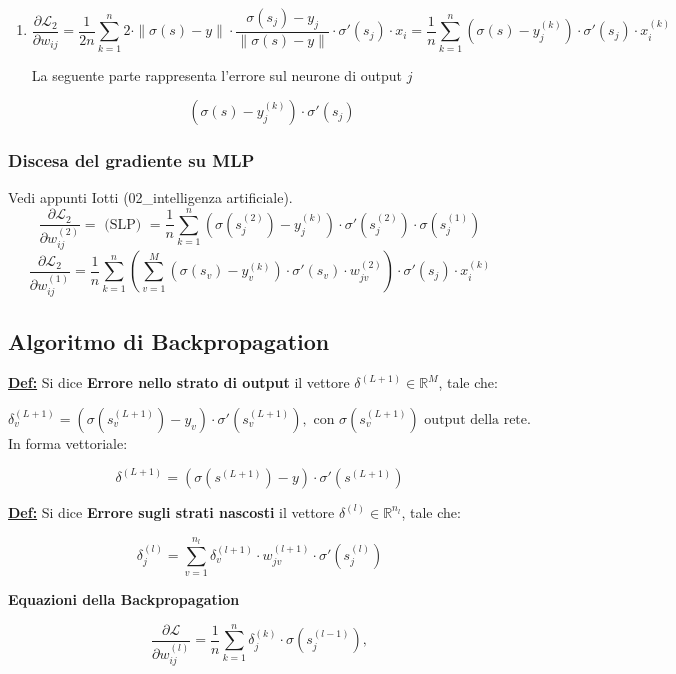 \documentclass[a4paper,12pt]{article}
\newcommand{\definizione}{\noindent\textbf{\underline{Def:}} }
\begin{document}
\begin{enumerate}
		\item

		\[
		\frac{\partial \mathcal{L}_2}{ \partial w_{ij}} = \frac{1}{2n} \sum_{k = 1}^{n} 2 \cdot \| \sigma(s) - y\| \cdot \frac{ \sigma(s_j) - y_j}{\| \sigma(s) - y \|} \cdot \sigma' (s_j) \cdot x_i = \frac{1}{n} \sum_{k = 1}^{n} (\sigma(s) - y_j^{(k)}) \cdot \sigma'(s_j) \cdot x_i^{(k)}
		\]

		La seguente parte rappresenta l'errore sul neurone di output $j$

		\[
		(\sigma(s) - y_j^{(k)}) \cdot \sigma'(s_j)
		\]
	\end{enumerate}

	\subsubsection{Discesa del gradiente su MLP}

	Vedi appunti Iotti (02\_intelligenza artificiale).
	\[
	\frac{\partial \mathcal{L}_2}{\partial w_{ij}^{(2)}} = \text{ (SLP) } = \frac{1}{n} \sum_{k=1}^{n} ( \sigma(s_j^{(2)}) - y_j^{(k)} )\cdot \sigma'(s_j^{(2)})  \cdot \sigma(s_j^{(1)})
	\]
	\[
	\frac{\partial \mathcal{L}_2}{\partial w_{ij}^{(1)}} = \frac{1}{n} \sum_{k = 1}^{n} \left( \sum_{v = 1}^{M} ( \sigma(s_v) - y_v^{(k)}) \cdot \sigma'(s_v) \cdot w_{jv}^{(2)} \right) \cdot \sigma'(s_j) \cdot x_i^{(k)}
	\]

	\subsection{Algoritmo di Backpropagation}

	\definizione Si dice \textbf{Errore nello strato di output} il vettore $\delta ^{(L + 1)} \in \mathbb{R}^M$, tale che:

	\[
	\delta_v^{(L + 1)} = ( \sigma (s_v^{(L + 1)}) - y_v) \cdot \sigma' (s_v^{(L + 1)}), \text{ con } \sigma(s_v^{(L+1)}) \text{ output della rete.}
	\]
	In forma vettoriale:

	\[
	\delta^{(L + 1)} = ( \sigma (s^{(L + 1)}) - y) \cdot \sigma' (s^{(L + 1)})
	\]

	\definizione Si dice \textbf{Errore sugli strati nascosti} il vettore $\delta^{(l)} \in \mathbb{R}^{n_l}$, tale che:

	\[
	\delta_j^{(l)} = \sum_{v = 1}^{n_l} \delta_v^{(l+1)} \cdot w_{jv}^{(l + 1)} \cdot \sigma'(s_j^{(l)})
	\]

	\noindent \textbf{Equazioni della Backpropagation}

	\[
	\frac{\partial \mathcal{L}}{\partial w_{ij}^{(l)}} = \frac{1}{n} \sum_{k = 1}^{n} \delta_j^{(k)} \cdot \sigma ( s_j^{(l - 1)}),
	\]
\end{document}
